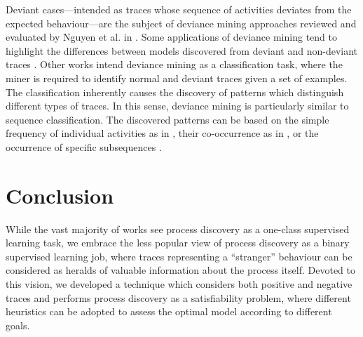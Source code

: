 \documentclass[a4wide,11pt]{article}
\theoremstyle{definition}
\theoremstyle{plain}
\begin{document}
Deviant cases---intended as traces whose sequence of activities deviates from the expected behaviour---are the subject of deviance mining approaches reviewed and evaluated by Nguyen et al. in \cite{2016-Nguyen}. Some applications of deviance mining tend to highlight the differences between models discovered from deviant and non-deviant traces \cite{2014-Suriadi,2014-Armas}. Other works intend deviance mining as a classification task, where the miner is required to identify normal and deviant traces given a set of examples. The classification inherently causes the discovery of patterns which distinguish different types of traces. In this sense, deviance mining is particularly similar to sequence classification. The discovered patterns can be based on the simple frequency of individual activities as in \cite{2013-Suriadi,2015-Partington}, their co-occurrence as in \cite{2011-Swinnen}, or the occurrence of specific subsequences \cite{2013-Bose,2007-Lo,2016-Bernardi}.
 
 
%
%
%





\section{Conclusion}
While the vast majority of works see process discovery as a one-class supervised learning task, we embrace the less popular view of process discovery as a binary supervised learning job, where traces representing a ``stranger'' behaviour can be considered as heralds of valuable information about the process itself. Devoted to this vision, we developed a technique which considers both positive and negative traces and performs process discovery as a satisfiability problem, where different heuristics can be adopted to assess the optimal model according to different goals.  
\end{document}

